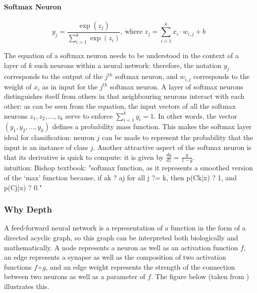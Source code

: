 \documentclass[a4paper,11pt]{article}
\begin{document}
\paragraph{Softmax Neuron}
\begin{equation}
\label{}
y_{j} = \frac{\exp(z_{j})}{\sum\limits_{i=1}^k\exp(z_{i})} \text{, where } z_{j} = \sum\limits_{i=1}^k x_{i}\cdot w_{i,j} + b
\end{equation}

The equation of a softmax neuron needs to be understood in the context of a layer of $k$ such neurons within a neural network: therefore, the notation $y_{j}$ corresponds to the output of the $j^{th}$ softmax neuron, and $w_{i,j}$ corresponds to the weight of $x_{i}$ as in input for the $j^{th}$ softmax neuron. A layer of softmax neurons distinguishes itself from others in that neighbouring neurons interact with each other: as can be seen from the equation, the input vectors of all the softmax neurons $z_{1}, z_{2}, ..., z_{k}$ serve to enforce $\sum\limits_{i=1}^k y_{i} = 1$. In other words, the vector $(y_{1}, y_{2}, ..., y_{k})$ defines a probability mass function. This makes the softmax layer ideal for classification: neuron $j$ can be made to represent the probability that the input is an instance of class $j$. Another attractive aspect of the softmax neuron is that its derivative is quick to compute: it is given by $\frac{dy}{dz} = \frac{y}{1-y}$. \\

intuition: Bishop textbook: "softmax function, as it represents
a smoothed version of the ‘max’ function because, if ak ? aj for all j ?= k, then p(Ck|x) ? 1, and p(Cj|x) ? 0."


\subsubsection{Why Depth}

A feed-forward neural network is a representation of a function in the form of a directed acyclic graph, so this graph can be interpreted both biologically and mathematically. A node represents a neuron as well as an activation function $f$, an edge represents a synapse as well as the composition of two activation functions $f \circ g$, and an edge weight represents the strength of the connection between two neurons as well as a parameter of $f$. The figure below (taken from \cite{DL-book}) illustrates this.
\end{document}
